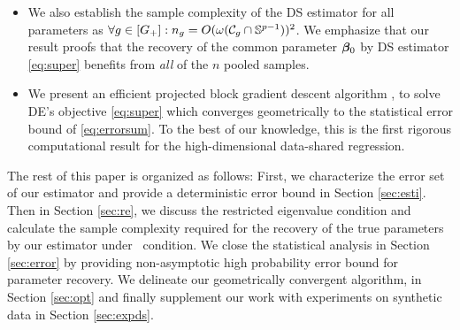 \begin{itemize}[leftmargin = .4cm]
	\item We also establish the sample complexity of the DS estimator for all parameters as $\forall g \in [G_+]: n_g = O(\omega(\cC_g \cap \sphere))^2$. We emphasize that our result proofs that the recovery of the common parameter $\boldsymbol{\beta}_0$ by DS estimator \eqref{eq:super} benefits from \emph{all} of the $n$ pooled samples.
	\item We present an efficient projected block gradient descent algorithm \emph{\dc}, to solve DE's objective \eqref{eq:super} which converges geometrically to the statistical error bound of \eqref{eq:errorsum}. To the best of our knowledge, this is the first rigorous computational result for the high-dimensional data-shared regression.
\end{itemize}

The rest of this paper is organized as follows:
First, we characterize the error set of our estimator and provide a deterministic error bound in Section \ref{sec:esti}.
Then in Section \ref{sec:re}, we discuss the restricted eigenvalue condition and calculate the sample complexity required for the recovery of the true parameters by our estimator under \ds\ condition.
We close the statistical analysis in Section \ref{sec:error} by providing non-asymptotic high probability error bound for parameter recovery.
We delineate our geometrically convergent algorithm, \dc{} in Section \ref{sec:opt} and finally supplement our work with experiments on synthetic data in Section \ref{sec:expds}.%

